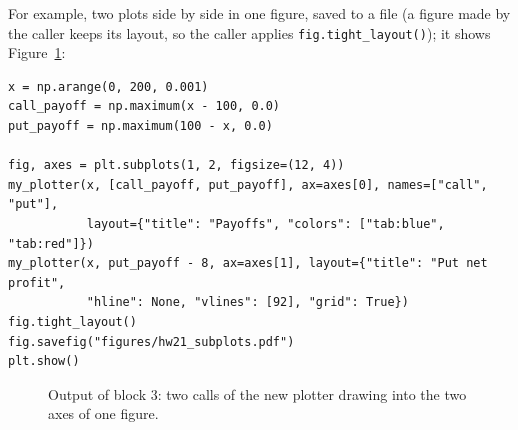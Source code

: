 \documentclass[11pt,a4paper]{article}
\newcommand{\src}[2]{\texttt{#1}, lines #2}
\begin{document}
\noindent For example, two plots side by side in one figure, saved to a file (a figure made by the caller keeps its layout, so the caller applies \texttt{fig.tight\_layout()}); it shows Figure~\ref{fig:subout}:
\par\smallskip\noindent\begin{minipage}{\linewidth}\begin{lstlisting}[style=py,title={\src{hw21\_examples.py}{38--49} (block 3)}]
x = np.arange(0, 200, 0.001)
call_payoff = np.maximum(x - 100, 0.0)
put_payoff = np.maximum(100 - x, 0.0)

fig, axes = plt.subplots(1, 2, figsize=(12, 4))
my_plotter(x, [call_payoff, put_payoff], ax=axes[0], names=["call", "put"],
           layout={"title": "Payoffs", "colors": ["tab:blue", "tab:red"]})
my_plotter(x, put_payoff - 8, ax=axes[1], layout={"title": "Put net profit",
           "hline": None, "vlines": [92], "grid": True})
fig.tight_layout()
fig.savefig("figures/hw21_subplots.pdf")
plt.show()
\end{lstlisting}\end{minipage}\par\smallskip
\begin{figure}[!ht]
\centering
{}
\caption{Output of block 3: two calls of the new plotter drawing into the two axes of one figure.}
\label{fig:subout}
\end{figure}
\end{document}
